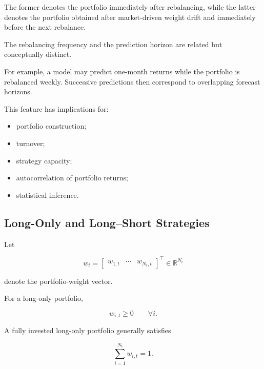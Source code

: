 \documentclass[11pt,a4paper]{article}
\begin{document}
The former denotes the portfolio immediately after rebalancing, while the
latter denotes the portfolio obtained after market-driven weight drift and
immediately before the next rebalance.

The rebalancing frequency and the prediction horizon are related but
conceptually distinct.

For example, a model may predict one-month returns while the portfolio is
rebalanced weekly. Successive predictions then correspond to overlapping
forecast horizons.

This feature has implications for:

\begin{itemize}
    \item portfolio construction;

    \item turnover;

    \item strategy capacity;

    \item autocorrelation of portfolio returns;

    \item statistical inference.
\end{itemize}


\subsection{Long-Only and Long--Short Strategies}
\label{subsec:long_short}

Let

\begin{equation}
w_t
=
\begin{bmatrix}
w_{1,t}
&
\cdots
&
w_{N_t,t}
\end{bmatrix}^{\top}
\in
\mathbb{R}^{N_t}
\end{equation}

denote the portfolio-weight vector.

For a long-only portfolio,

\begin{equation}
w_{i,t}\geq 0
\qquad
\forall i.
\end{equation}

A fully invested long-only portfolio generally satisfies

\begin{equation}
\sum_{i=1}^{N_t}
w_{i,t}
=
1.
\end{equation}
\end{document}
